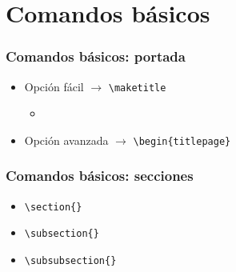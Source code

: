 

\section{Comandos básicos}

\begin{frame}[fragile]
\frametitle{Comandos básicos: portada}

\begin{itemize}
 \item Opción fácil $\rightarrow$ \verb|\maketitle|
 \begin{itemize}
     \item 
 \end{itemize}
 \item Opción avanzada $\rightarrow$ \verb|\begin{titlepage}|
\end{itemize}


\end{frame}

\begin{frame}[fragile]
\frametitle{Comandos básicos: secciones}
\begin{itemize}
    \item \verb|\section{}|
    \item \verb|\subsection{}|
    \item \verb|\subsubsection{}|
\end{itemize}

\end{frame}

